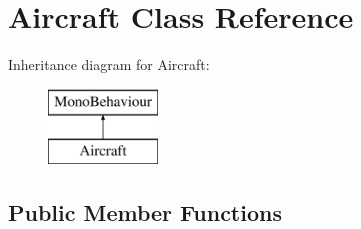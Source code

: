 \hypertarget{class_aircraft}{}\section{Aircraft Class Reference}
\label{class_aircraft}
Inheritance diagram for Aircraft\+:\begin{figure}[H]
\begin{center}
\leavevmode
\includegraphics[height=2.000000cm]{class_aircraft}
\end{center}
\end{figure}
\subsection*{Public Member Functions}
